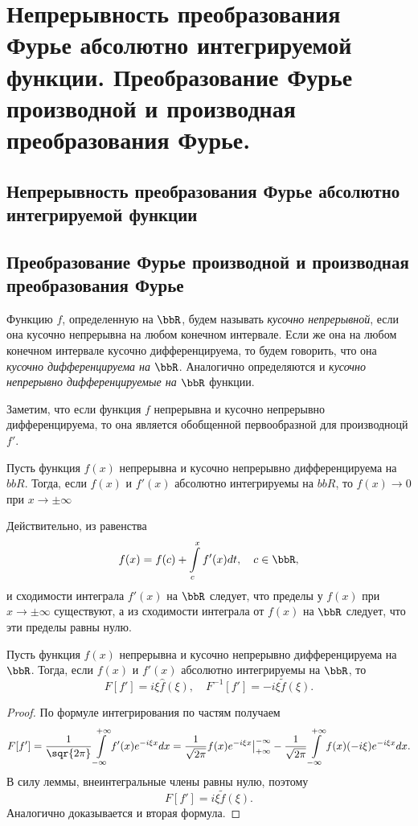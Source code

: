\chapter{Непрерывность преобразования Фурье абсолютно интегрируемой функции. Преобразование Фурье производной и производная преобразования Фурье.}
\section{Непрерывность преобразования Фурье абсолютно интегрируемой функции}
\section{Преобразование Фурье производной и производная преобразования Фурье}

Функцию $f$, определенную на $\bbR$, будем называть \textit{кусочно непрерывной}, если она кусочно непрерывна на любом конечном интервале. Если же она на любом конечном интервале кусочно дифференцируема, то будем говорить, что она \textit{кусочно дифференцируема на $\bbR$}. Аналогично определяются и \textit{кусочно непрерывно дифференцируемые на $\bbR$} функции. 

Заметим, что если функция $f$ непрерывна и кусочно непрерывно дифференцируема, то она является обобщенной первообразной для производноцй $f'$.

\begin{lemm}
Пусть функция $f(x)$ непрерывна и кусочно непрерывно дифференцируема на $bbR$. Тогда, если $f(x)$ и $f'(x)$ абсолютно интегрируемы на $bbR$, то $f(x)\to 0$ при $x\to\pm\infty$
\end{lemm}

Действительно, из равенства
$$
f(x)=f(c)+\int\limits_c^x f'(x)dt,\quad c\in\bbR,
$$
и сходимости интеграла $f'(x)$ на $\bbR$ следует, что пределы у $f(x)$ при $x\to\pm\infty$ существуют, а из сходимости интеграла от $f(x)$ на $\bbR$ следует, что эти пределы равны нулю.

\begin{thm}
Пусть функция $f(x)$ непрерывна и кусочно непрерывно дифференцируема на $\bbR$. Тогда, если $f(x)$ и $f'(x)$ абсолютно интегрируемы на $\bbR$, то
$$
F[f']=i\xi\widehat{f}(\xi),\quad F^{-1}[f']=-i\xi \widetilde{f}(\xi).
$$
\end{thm}

\begin{proof}
По формуле интегрирования по частям получаем
$$
F[f']=\frac{1}{\sqr{2\pi}}\int\limits_{-\infty}^{+\infty} f'(x)e^{-i\xi x}dx=\frac{1}{\sqrt{2\pi}}f(x)e^{-i\xi x}	
\bigr|^{-\infty}_{+\infty} - \frac{1}{\sqrt{2\pi}}\int\limits_{-\infty}^{+\infty}f(x)(-i\xi)e^{-i\xi x}dx.
$$
В силу леммы, внеинтегральные члены равны нулю, поэтому
$$
F[f']=i\xi\widetilde{f}(\xi).
$$
Аналогично доказывается и вторая формула.
\end{proof}

